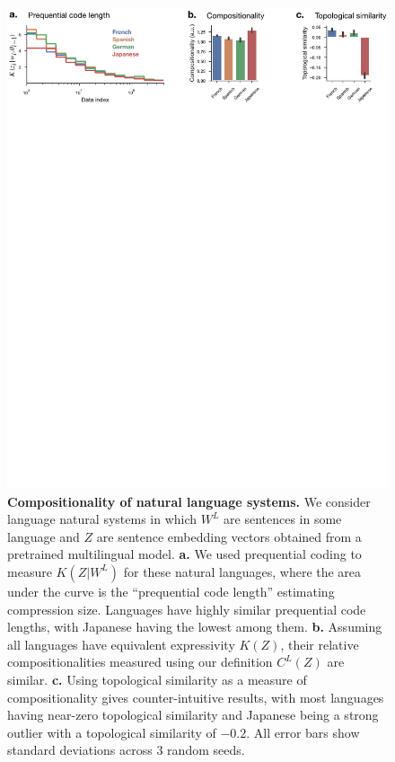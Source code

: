 \documentclass{article} %
\begin{document}
\begin{figure}[ht]
    \centering
    \includegraphics[width=\linewidth]{figures/natural.pdf}
    \caption{\textbf{Compositionality of natural language systems.} We consider language natural systems in which $W^L$ are sentences in some language and $Z$ are sentence embedding vectors obtained from a pretrained multilingual model. \textbf{a.} We used prequential coding to measure $K(Z | W^L)$ for these natural languages, where the area under the curve is the ``prequential code length'' estimating compression size. Languages have highly similar prequential code lengths, with Japanese having the lowest among them. \textbf{b.} Assuming all languages have equivalent expressivity $K(Z)$, their relative compositionalities measured using our definition $C^L(Z)$ are similar. \textbf{c.} Using topological similarity as a measure of compositionality gives counter-intuitive results, with most languages having near-zero topological similarity and Japanese being a strong outlier with a topological similarity of $-0.2$.  All error bars show standard deviations across $3$ random seeds.}
    \label{fig:natural}
\end{figure}
\end{document}
